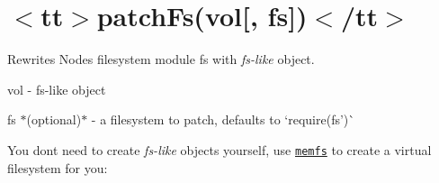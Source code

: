 \chapter{\texorpdfstring{$<$}{<}tt\texorpdfstring{$>$}{>}patch\+Fs(vol\mbox{[}, fs\mbox{]})\texorpdfstring{$<$}{<}/tt\texorpdfstring{$>$}{>}}
\hypertarget{md_pkiclassroomrescheduler_2src_2main_2frontend_2node__modules_2fs-monkey_2docs_2api_2patch_fs}{}\label{md_pkiclassroomrescheduler_2src_2main_2frontend_2node__modules_2fs-monkey_2docs_2api_2patch_fs}
\label{md_pkiclassroomrescheduler_2src_2main_2frontend_2node__modules_2fs-monkey_2docs_2api_2patch_fs_autotoc_md13084}%
%
 Rewrites Node\textquotesingle{}s filesystem module {\ttfamily fs} with {\itshape fs-\/like} object.


\begin{DoxyItemize}
\item {\ttfamily vol} -\/ fs-\/like object
\item {\ttfamily fs} \texorpdfstring{$\ast$}{*}(optional)\texorpdfstring{$\ast$}{*} -\/ a filesystem to patch, defaults to `require(\textquotesingle{}fs')\`{}
\end{DoxyItemize}


\begin{DoxyCode}{0}
\DoxyCodeLine{}
\DoxyCodeLine{\};}
\DoxyCodeLine{}

\end{DoxyCode}


You don\textquotesingle{}t need to create {\itshape fs-\/like} objects yourself, use \href{https://github.com/streamich/memfs}{\texttt{ {\ttfamily memfs}}} to create a virtual filesystem for you\+:


\begin{DoxyCode}{0}
\DoxyCodeLine{}

\end{DoxyCode}
 